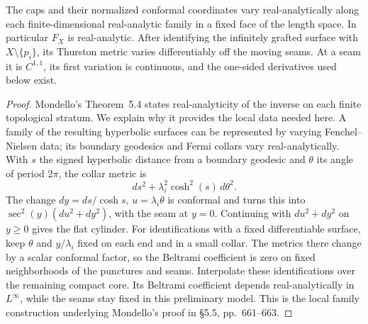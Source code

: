\begin{lemma}
\label{C:A2b-regularity}
The caps and their normalized conformal coordinates vary real-analytically along each finite-dimensional real-analytic family in a fixed face of the length space. In particular $F_X$ is real-analytic. After identifying the infinitely grafted surface with $X\setminus\{p_i\}$, its Thurston metric varies differentiably off the moving seams. At a seam it is $C^{1,1}$, its first variation is continuous, and the one-sided derivatives used below exist.
\end{lemma}
\begin{proof}
Mondello's Theorem~5.4 states real-analyticity of the inverse on each finite topological stratum. We explain why it provides the local data needed here. A family of the resulting hyperbolic surfaces can be represented by varying Fenchel--Nielsen data; its boundary geodesics and Fermi collars vary real-analytically. With $s$ the signed hyperbolic distance from a boundary geodesic and $\theta$ its angle of period $2\pi$, the collar metric is
\[
 ds^2+\lambda_i^2\cosh^2(s)\,d\theta^2.
\]
The change $dy=ds/\cosh s$, $u=\lambda_i\theta$ is conformal and turns this into $\sec^2(y)(du^2+dy^2)$, with the seam at $y=0$. Continuing with $du^2+dy^2$ on $y\geq0$ gives the flat cylinder. For identifications with a fixed differentiable surface, keep $\theta$ and $y/\lambda_i$ fixed on each end and in a small collar. The metrics there change by a scalar conformal factor, so the Beltrami coefficient is zero on fixed neighborhoods of the punctures and seams. Interpolate these identifications over the remaining compact core. Its Beltrami coefficient depends real-analytically in $L^\infty$, while the seams stay fixed in this preliminary model. This is the local family construction underlying Mondello's proof in \S5.5, pp.~661--663.


\end{proof}
